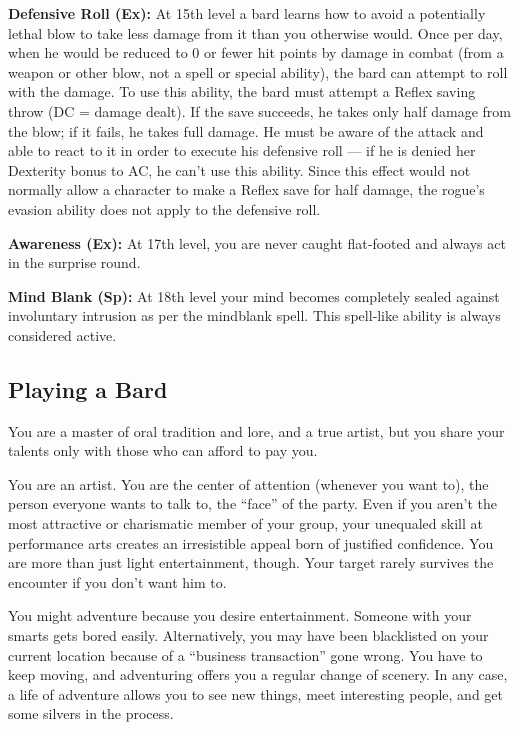 \textbf{Defensive Roll (Ex):} At 15th level a bard learns how to avoid a potentially lethal blow to take less damage from it than you otherwise would. Once per day, when he would be reduced to 0 or fewer hit points by damage in combat (from a weapon or other blow, not a spell or special ability), the bard can attempt to roll with the damage. To use this ability, the bard must attempt a Reflex saving throw (DC = damage dealt). If the save succeeds, he takes only half damage from the blow; if it fails, he takes full damage. He must be aware of the attack and able to react to it in order to execute his defensive roll — if he is denied her Dexterity bonus to AC, he can't use this ability. Since this effect would not normally allow a character to make a Reflex save for half damage, the rogue's evasion ability does not apply to the defensive roll.

\textbf{Awareness (Ex):} At 17th level, you are never caught flat‐footed and always act in the surprise round.

\textbf{Mind Blank (Sp):} At 18th level your mind becomes completely sealed against involuntary intrusion as per the mindblank spell. This spell‐like ability is always considered active.

\subsection{Playing a Bard}

You are a master of oral tradition and lore, and a true artist, but you share your talents only with those who can afford to pay you.

You are an artist. You are the center of attention (whenever you want to), the person everyone wants to talk to, the “face” of the party. Even if you aren't the most attractive or charismatic member of your group, your unequaled skill at performance arts creates an irresistible appeal born of justified confidence. You are more than just light entertainment, though. Your target rarely survives the encounter if you don't want him to.

You might adventure because you desire entertainment. Someone with your smarts gets bored easily. Alternatively, you may have been blacklisted on your current location because of a “business transaction” gone wrong. You have to keep moving, and adventuring offers you a regular change of scenery. In any case, a life of adventure allows you to see new things, meet interesting people, and get some silvers in the process.

